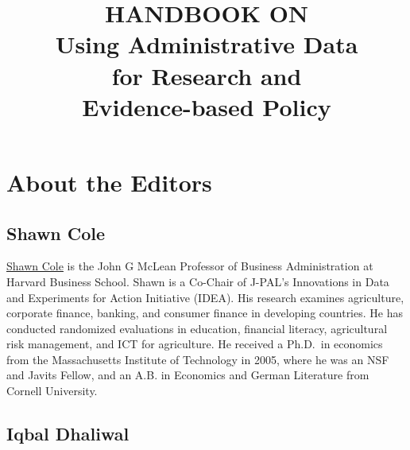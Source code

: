 \documentclass[11pt]{book}
\title{ \Large \uppercase{Handbook on} \\\Huge\bfseries {Using Administrative Data \\ for Research and \\ Evidence-based Policy}}
\author{\sffamily \Large \authorthing}
\date{ }
\makeatletter
\renewcommand{\pagenumbering}[1]{\gdef\thepage{\csname
@#1\endcsname\c@page}}
\makeatother
\begin{document}
\bibliographyunit[\chapter]

\frontmatter
\newpage\null\thispagestyle{empty}
\newpage

\pagenumbering{roman}

\maketitle

\newpage\null\thispagestyle{empty}\newpage


\tableofcontents 


\newpage
\pagestyle{fancy}


\cleardoublepage
{}
{}

\section*{About the Editors}\label{about-the-editors}

\subsection*{Shawn Cole}\label{shawn-cole}

\href{https://www.hbs.edu/faculty/Pages/profile.aspx?facId=340064}{Shawn
Cole} is the John G McLean Professor of Business Administration at
Harvard Business School. Shawn is a Co-Chair of J-PAL's Innovations in
Data and Experiments for Action Initiative (IDEA). His research examines
agriculture, corporate finance, banking, and consumer finance in
developing countries. He has conducted randomized evaluations in
education, financial literacy, agricultural risk management, and ICT for
agriculture. He received a Ph.D.~in economics from the Massachusetts
Institute of Technology in 2005, where he was an NSF and Javits Fellow,
and an A.B. in Economics and German Literature from Cornell University.

\subsection*{Iqbal Dhaliwal}\label{iqbal-dhaliwal}
\end{document}
